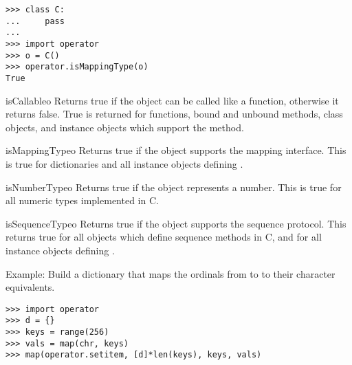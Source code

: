 \begin{verbatim}
>>> class C:
...     pass
... 
>>> import operator
>>> o = C()
>>> operator.isMappingType(o)
True
\end{verbatim}

\begin{funcdesc}{isCallable}{o}
Returns true if the object  can be called like a function,
otherwise it returns false.  True is returned for functions, bound and
unbound methods, class objects, and instance objects which support the
 method.
\end{funcdesc}

\begin{funcdesc}{isMappingType}{o}
Returns true if the object  supports the mapping interface.
This is true for dictionaries and all instance objects defining
.
\end{funcdesc}

\begin{funcdesc}{isNumberType}{o}
Returns true if the object  represents a number.  This is true
for all numeric types implemented in C.
\end{funcdesc}

\begin{funcdesc}{isSequenceType}{o}
Returns true if the object  supports the sequence protocol.
This returns true for all objects which define sequence methods in C,
and for all instance objects defining .
\end{funcdesc}


Example: Build a dictionary that maps the ordinals from  to
 to their character equivalents.

\begin{verbatim}
>>> import operator
>>> d = {}
>>> keys = range(256)
>>> vals = map(chr, keys)
>>> map(operator.setitem, [d]*len(keys), keys, vals)
\end{verbatim}


